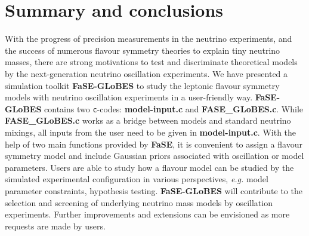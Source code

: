 \documentclass[aps,prd,nofootinbib,preprint]{revtex4}
\begin{document}
%



\section{Summary and conclusions}

With the progress of precision measurements in the neutrino experiments, and the success of numerous flavour symmetry theories to explain tiny neutrino masses, there are strong motivations to test and discriminate theoretical models by the next-generation neutrino oscillation experiments. We have presented a simulation toolkit \textbf{FaSE-GLoBES} to study the leptonic flavour symmetry models with neutrino oscillation experiments in a user-friendly way. \textbf{FaSE-GLoBES} contains two \texttt{c}-codes: \textbf{model-input.c} and \textbf{FASE\_GLoBES.c}. While \textbf{FASE\_GLoBES.c} works as a bridge between models and standard neutrino mixings, all inputs from the user need to be given in \textbf{model-input.c}. With the help of two main functions provided by \textbf{FaSE}, it is convenient to assign a flavour symmetry model and include Gaussian priors associated with oscillation or model parameters. Users are able to study how a flavour model can be studied by the simulated experimental configuration in various perspectives, \textit{e.g.} model parameter constraints, hypothesis testing. \textbf{FaSE-GLoBES} will contribute to the selection and screening of underlying neutrino mass models by oscillation experiments. Further improvements and extensions can be envisioned as more requests are made by users.
\end{document}

